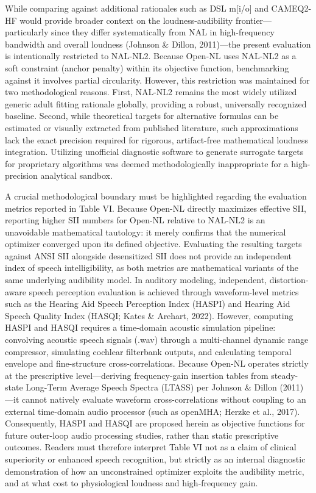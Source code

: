 \documentclass[
  12pt,
]{article}
\begin{document}
While comparing against additional rationales such as DSL m{[}i/o{]} and
CAMEQ2-HF would provide broader context on the loudness-audibility
frontier---particularly since they differ systematically from NAL in
high-frequency bandwidth and overall loudness (Johnson \& Dillon,
2011)---the present evaluation is intentionally restricted to NAL-NL2.
Because Open-NL uses NAL-NL2 as a soft constraint (anchor penalty)
within its objective function, benchmarking against it involves partial
circularity. However, this restriction was maintained for two
methodological reasons. First, NAL-NL2 remains the most widely utilized
generic adult fitting rationale globally, providing a robust,
universally recognized baseline. Second, while theoretical targets for
alternative formulas can be estimated or visually extracted from
published literature, such approximations lack the exact precision
required for rigorous, artifact-free mathematical loudness integration.
Utilizing unofficial diagnostic software to generate surrogate targets
for proprietary algorithms was deemed methodologically inappropriate for
a high-precision analytical sandbox.

A crucial methodological boundary must be highlighted regarding the
evaluation metrics reported in Table VI. Because Open-NL directly
maximizes effective SII, reporting higher SII numbers for Open-NL
relative to NAL-NL2 is an unavoidable mathematical tautology: it merely
confirms that the numerical optimizer converged upon its defined
objective. Evaluating the resulting targets against ANSI SII alongside
desensitized SII does not provide an independent index of speech
intelligibility, as both metrics are mathematical variants of the same
underlying audibility model. In auditory modeling, independent,
distortion-aware speech perception evaluation is achieved through
waveform-level metrics such as the Hearing Aid Speech Perception Index
(HASPI) and Hearing Aid Speech Quality Index (HASQI; Kates \& Arehart,
2022). However, computing HASPI and HASQI requires a time-domain
acoustic simulation pipeline: convolving acoustic speech signals (.wav)
through a multi-channel dynamic range compressor, simulating cochlear
filterbank outputs, and calculating temporal envelope and fine-structure
cross-correlations. Because Open-NL operates strictly at the
prescriptive level---deriving frequency-gain insertion tables from
steady-state Long-Term Average Speech Spectra (LTASS) per Johnson \&
Dillon (2011)---it cannot natively evaluate waveform cross-correlations
without coupling to an external time-domain audio processor (such as
openMHA; Herzke et al., 2017). Consequently, HASPI and HASQI are
proposed herein as objective functions for future outer-loop audio
processing studies, rather than static prescriptive outcomes. Readers
must therefore interpret Table VI not as a claim of clinical superiority
or enhanced speech recognition, but strictly as an internal diagnostic
demonstration of how an unconstrained optimizer exploits the audibility
metric, and at what cost to physiological loudness and high-frequency
gain.
\end{document}
